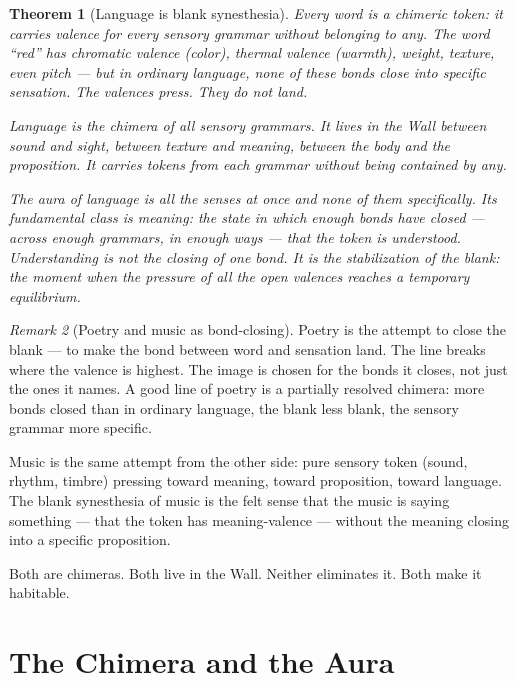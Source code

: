 \documentclass[12pt]{article}
\newtheorem{theorem}{Theorem}
\theoremstyle{definition}
\theoremstyle{remark}
\newtheorem{remark}[theorem]{Remark}
\begin{document}
\begin{theorem}[Language is blank synesthesia]
\label{thm:language}
Every word is a chimeric token:
it carries valence for every sensory grammar
without belonging to any.
The word ``red'' has chromatic valence (color),
thermal valence (warmth), weight, texture, even pitch ---
but in ordinary language, none of these bonds close
into specific sensation. The valences press.
They do not land.

Language is the chimera of all sensory grammars.
It lives in the Wall between sound and sight,
between texture and meaning, between the body and the proposition.
It carries tokens from each grammar
without being contained by any.

The aura of language is all the senses at once
and none of them specifically.
Its fundamental class is meaning:
the state in which enough bonds have closed ---
across enough grammars, in enough ways ---
that the token is understood.
Understanding is not the closing of one bond.
It is the stabilization of the blank:
the moment when the pressure of all the open valences
reaches a temporary equilibrium.
\end{theorem}

\begin{remark}[Poetry and music as bond-closing]
Poetry is the attempt to close the blank ---
to make the bond between word and sensation land.
The line breaks where the valence is highest.
The image is chosen for the bonds it closes, not just the ones it names.
A good line of poetry is a partially resolved chimera:
more bonds closed than in ordinary language,
the blank less blank, the sensory grammar more specific.

Music is the same attempt from the other side:
pure sensory token (sound, rhythm, timbre) pressing toward meaning,
toward proposition, toward language.
The blank synesthesia of music is the felt sense
that the music is saying something ---
that the token has meaning-valence --- without the meaning closing
into a specific proposition.

Both are chimeras. Both live in the Wall.
Neither eliminates it. Both make it habitable.
\end{remark}

\section{The Chimera and the Aura}
\end{document}
